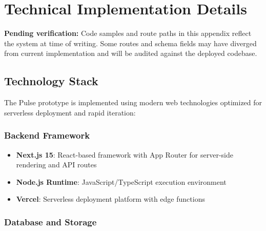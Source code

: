\chapter{Technical Implementation Details}
\label{appendix:technical}

\begin{todobox}
\textbf{Pending verification:} Code samples and route paths in this appendix reflect the system at time of writing. Some routes and schema fields may have diverged from current implementation and will be audited against the deployed codebase.
\end{todobox}

\section{Technology Stack}

The Pulse prototype is implemented using modern web technologies optimized for serverless deployment and rapid iteration:

\subsection{Backend Framework}

\begin{itemize}
    \item \textbf{Next.js 15}: React-based framework with App Router for server-side rendering and API routes
    \item \textbf{Node.js Runtime}: JavaScript/TypeScript execution environment
    \item \textbf{Vercel}: Serverless deployment platform with edge functions
\end{itemize}

\subsection{Database and Storage}

